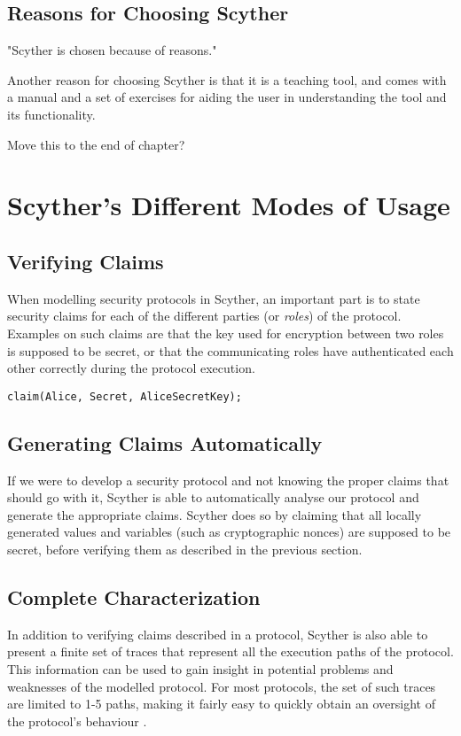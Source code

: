 \subsection{Reasons for Choosing Scyther}

"Scyther is chosen because of reasons."

Another reason for choosing Scyther is that it is a teaching tool, and comes with a manual and a set of exercises for aiding the user in understanding the tool and its functionality.

Move this to the end of chapter?

\section{Scyther's Different Modes of Usage}

\subsection{Verifying Claims}

When modelling security protocols in Scyther, an important part is to state security claims for each of the different parties (or \emph{roles}) of the protocol. Examples on such claims are that the key used for encryption between two roles is supposed to be secret, or that the communicating roles have authenticated each other correctly during the protocol execution. 
\begin{verbatim}
claim(Alice, Secret, AliceSecretKey);
\end{verbatim}

\subsection{Generating Claims Automatically}

If we were to develop a security protocol and not knowing the proper claims that should go with it, Scyther is able to automatically analyse our protocol and generate the appropriate claims. Scyther does so by claiming that all locally generated values and variables (such as cryptographic nonces) are supposed to be secret, before verifying them as described in the previous section.

\subsection{Complete Characterization}


In addition to verifying claims described in a protocol, Scyther is also able to present a finite set of traces that represent all the execution paths of the protocol. This information can be used to gain insight in potential problems and weaknesses of the modelled protocol. For most protocols, the set of such traces are limited to 1-5 paths, making it fairly easy to quickly obtain an oversight of the protocol's behaviour \cite{cremers2008scyther}.




